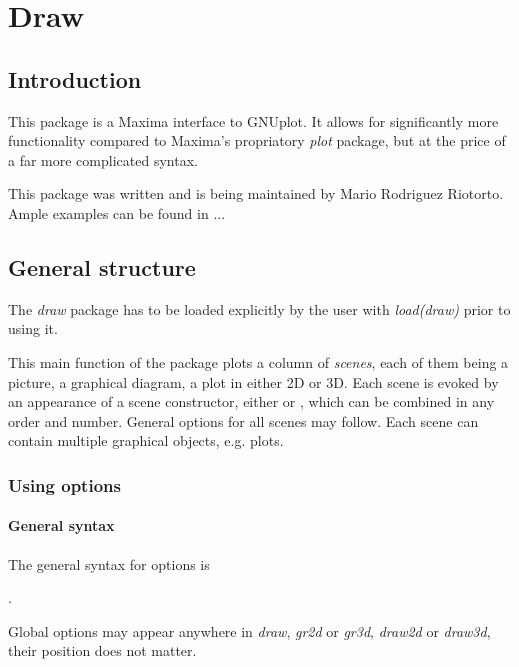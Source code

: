 \documentclass[../Maxima_Workbook.tex]{subfiles}
\begin{document}
\section{Draw}

\subsection{Introduction}

This package is a Maxima interface to GNUplot. It allows for significantly more functionality compared to Maxima's propriatory \emph{plot} package, but at the price of a far more complicated syntax.

\lz This package was written and is being maintained by Mario Rodriguez Riotorto. Ample examples can be found in ...

\subsection{General structure}

The \emph{draw} package has to be loaded explicitly by the user with \emph{load(draw)} prior to using it.

\lz {} \hfill \tcr{[function]}

\lz This main function of the package plots a column of \emph{scenes},  each of them being a picture, a graphical diagram, a plot in either 2D or 3D. Each scene is evoked by an appearance of a scene constructor, either   or , which can be combined in any order and number. General options for all scenes may follow. Each scene can contain multiple graphical objects, e.g. plots. 

\subsubsection{Using options}

\paragraph{General syntax} \mbox{}

\lz The general syntax for options is

\lz {}.

\lz Global options may appear anywhere in \emph{draw}, \emph{gr2d} or \emph{gr3d}, \emph{draw2d} or \emph{draw3d}, their position does not matter.
\end{document}
